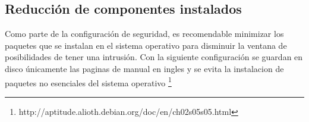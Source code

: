       \subsection {Reducci\'{o}n de componentes instalados}

Como parte de la configuraci\'{o}n de seguridad, es recomendable minimizar los paquetes que se instalan en el sistema operativo para disminuir la ventana de posibilidades de tener una intrusi\'{o}n. Con la siguiente configuraci\'{o}n se guardan en disco \'{u}nicamente las paginas de manual en ingles y se evita la instalacion de paquetes no esenciales del sistema operativo \footnote{http://aptitude.alioth.debian.org/doc/en/ch02s05s05.html}

%
